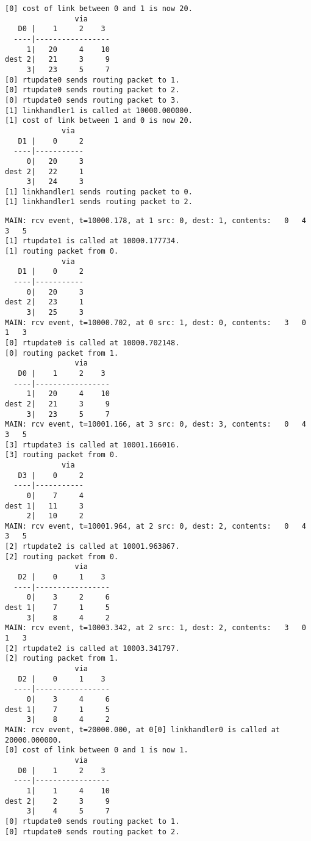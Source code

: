 \documentclass[12pt]{article}
\begin{document}
\begin{Verbatim}[frame=single, rulecolor=\color{green}, label=Link Handlers] 
[0] cost of link between 0 and 1 is now 20.
                via     
   D0 |    1     2    3 
  ----|-----------------
     1|   20     4    10
dest 2|   21     3     9
     3|   23     5     7
[0] rtupdate0 sends routing packet to 1.
[0] rtupdate0 sends routing packet to 2.
[0] rtupdate0 sends routing packet to 3.
[1] linkhandler1 is called at 10000.000000.
[1] cost of link between 1 and 0 is now 20.
             via   
   D1 |    0     2 
  ----|-----------
     0|   20     3
dest 2|   22     1
     3|   24     3
[1] linkhandler1 sends routing packet to 0.
[1] linkhandler1 sends routing packet to 2.
\end{Verbatim}
\begin{Verbatim}
MAIN: rcv event, t=10000.178, at 1 src: 0, dest: 1, contents:   0   4   3   5
[1] rtupdate1 is called at 10000.177734.
[1] routing packet from 0.
             via   
   D1 |    0     2 
  ----|-----------
     0|   20     3
dest 2|   23     1
     3|   25     3
MAIN: rcv event, t=10000.702, at 0 src: 1, dest: 0, contents:   3   0   1   3
[0] rtupdate0 is called at 10000.702148.
[0] routing packet from 1.
                via     
   D0 |    1     2    3 
  ----|-----------------
     1|   20     4    10
dest 2|   21     3     9
     3|   23     5     7
MAIN: rcv event, t=10001.166, at 3 src: 0, dest: 3, contents:   0   4   3   5
[3] rtupdate3 is called at 10001.166016.
[3] routing packet from 0.
             via     
   D3 |    0     2 
  ----|-----------
     0|    7     4
dest 1|   11     3
     2|   10     2
MAIN: rcv event, t=10001.964, at 2 src: 0, dest: 2, contents:   0   4   3   5
[2] rtupdate2 is called at 10001.963867.
[2] routing packet from 0.
                via     
   D2 |    0     1    3 
  ----|-----------------
     0|    3     2     6
dest 1|    7     1     5
     3|    8     4     2
MAIN: rcv event, t=10003.342, at 2 src: 1, dest: 2, contents:   3   0   1   3
[2] rtupdate2 is called at 10003.341797.
[2] routing packet from 1.
                via     
   D2 |    0     1    3 
  ----|-----------------
     0|    3     4     6
dest 1|    7     1     5
     3|    8     4     2
MAIN: rcv event, t=20000.000, at 0[0] linkhandler0 is called at 20000.000000.
[0] cost of link between 0 and 1 is now 1.
                via     
   D0 |    1     2    3 
  ----|-----------------
     1|    1     4    10
dest 2|    2     3     9
     3|    4     5     7
[0] rtupdate0 sends routing packet to 1.
[0] rtupdate0 sends routing packet to 2.

\end{Verbatim}
\end{document}
